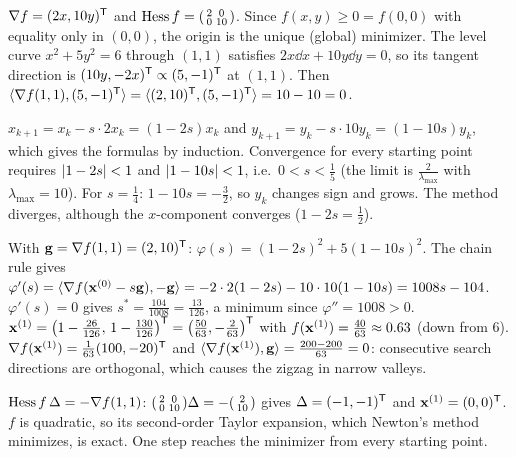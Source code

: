 \begin{solution}
 $\nabla f=(2x,10y)^{\mathsf{T}}$ and $\operatorname{Hess} f=\begin{psmallmatrix}2&0\\0&10\end{psmallmatrix}$. Since $f(x,y)\ge0=f(0,0)$ with equality only in $(0,0)$, the origin is the unique (global) minimizer. 
The level curve $x^2+5y^2=6$ through $(1,1)$ satisfies $2x\dd x+10y\dd y=0$, so its tangent direction is $(10y,-2x)^{\mathsf{T}}\propto(5,-1)^{\mathsf{T}}$ at $(1,1)$. Then $\langle \nabla f(1,1),(5,-1)^{\mathsf{T}}\rangle=\langle (2,10)^{\mathsf{T}},(5,-1)^{\mathsf{T}}\rangle=10-10=0$. 

 $x_{k+1}=x_k-s\cdot2x_k=(1-2s)x_k$ and $y_{k+1}=y_k-s\cdot10y_k=(1-10s)y_k$, which gives the formulas by induction. 
Convergence for every starting point requires $\lvert 1-2s\rvert<1$ and $\lvert 1-10s\rvert<1$, i.e.\ $0<s<\frac15$ (the limit is $\frac2{\lambda_{\max}}$ with $\lambda_{\max}=10$). 
For $s=\frac14$: $1-10s=-\frac32$, so $y_k$ changes sign and grows. The method diverges, although the $x$-component converges ($1-2s=\frac12$). 

 With $\mathbf{g}=\nabla f(1,1)=(2,10)^{\mathsf{T}}$: $\varphi(s)=(1-2s)^2+5(1-10s)^2$. The chain rule gives $\varphi'(s)=\langle \nabla f(\mathbf{x}^{(0)}-s\mathbf{g}),-\mathbf{g}\rangle=-2\cdot2(1-2s)-10\cdot10(1-10s)=1008s-104$. 
$\varphi'(s)=0$ gives $s^*=\frac{104}{1008}=\frac{13}{126}$, a minimum since $\varphi''=1008>0$. 
$\mathbf{x}^{(1)}=\big(1-\frac{26}{126},\,1-\frac{130}{126}\big)^{\mathsf{T}}=\big(\frac{50}{63},-\frac2{63}\big)^{\mathsf{T}}$ with $f(\mathbf{x}^{(1)})=\frac{40}{63}\approx0.63$ (down from $6$). $\nabla f(\mathbf{x}^{(1)})=\frac1{63}(100,-20)^{\mathsf{T}}$ and $\langle \nabla f(\mathbf{x}^{(1)}),\mathbf{g}\rangle=\frac{200-200}{63}=0$: consecutive search directions are orthogonal, which causes the zigzag in narrow valleys. 

 $\operatorname{Hess} f\,\Delta=-\nabla f(1,1)$: $\begin{psmallmatrix}2&0\\0&10\end{psmallmatrix}\Delta=-\begin{psmallmatrix}2\\10\end{psmallmatrix}$ gives $\Delta=(-1,-1)^{\mathsf{T}}$ and $\mathbf{x}^{(1)}=(0,0)^{\mathsf{T}}$. 
$f$ is quadratic, so its second-order Taylor expansion, which Newton's method minimizes, is exact. One step reaches the minimizer from every starting point. 


\end{solution}
